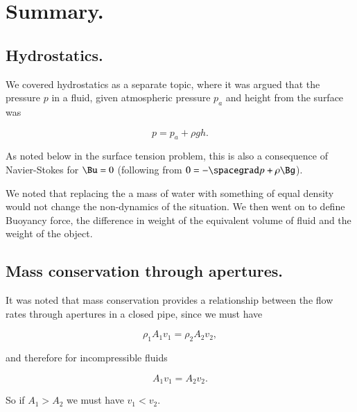 \section{Summary.}
\subsection{Hydrostatics.}

We covered hydrostatics as a separate topic, where it was argued that the pressure $p$ in a fluid, given atmospheric pressure $p_a$ and height from the surface was

\begin{equation}\label{eqn:continuumFluidsReview:1850}
p = p_a + \rho g h.
\end{equation}

As noted below in the surface tension problem, this is also a consequence of Navier-Stokes for $\Bu = 0$ (following from $0 = -\spacegrad p + \rho \Bg$).

We noted that replacing the a mass of water with something of equal density would not change the non-dynamics of the situation.  We then went on to define Buoyancy force, the difference in weight of the equivalent volume of fluid and the weight of the object.

\subsection{Mass conservation through apertures.}

It was noted that mass conservation provides a relationship between the flow rates through apertures in a closed pipe, since we must have

\begin{equation}\label{eqn:continuumFluidsReview:1870}
\rho_1 A_1 v_1 = \rho_2 A_2 v_2,
\end{equation}

and therefore for incompressible fluids

\begin{equation}\label{eqn:continuumFluidsReview:1890}
A_1 v_1 = A_2 v_2.
\end{equation}

So if $A_1 > A_2$ we must have $v_1 < v_2$.
